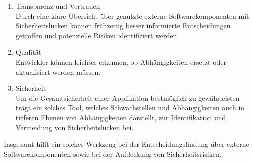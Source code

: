     \begin{enumerate}
        \item Transparenz und Vertrauen\\
            Durch eine klare Übersicht über genutzte externe Softwarekomponenten mit Sicherheitslücken können frühzeitig besser informierte Entscheidungen getroffen und potenzielle Risiken identifiziert werden.
        \item Qualität\\
            Entwickler können leichter erkennen, ob Abhängigkeiten ersetzt oder aktualisiert werden müssen.
        \item Sicherheit\\
            Um die Gesamtsicherheit einer Applikation bestmöglich zu gewährleisten trägt ein solches Tool, welches Schwachstellen und Abhängigkeiten auch in tieferen Ebenen von Abhängigkeiten darstellt, zur Identifikation und Vermeidung von Sicherheitslücken bei. 
    \end{enumerate}
    Insgesamt hilft ein solches Werkzeug bei der Entscheidungsfindung über externe Softwarekomponenten sowie bei der Aufdeckung von Sicherheitsrisiken.